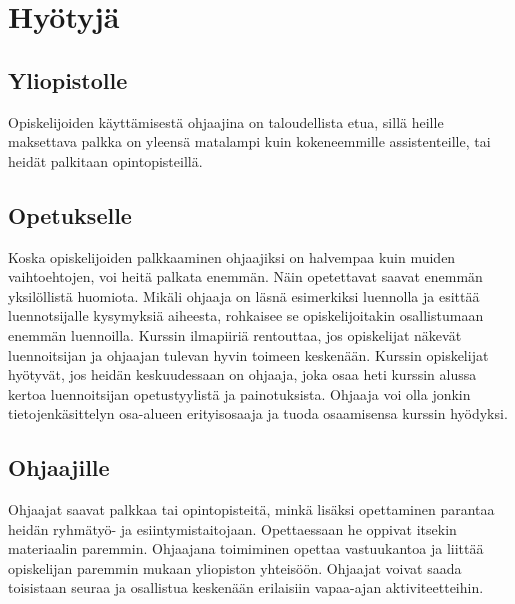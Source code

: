 \documentclass[finnish]{tktltiki2}
\theoremstyle{definition}
\theoremstyle{remark}
\begin{document}
\section{Hyötyjä}

\subsection{Yliopistolle}
Opiskelijoiden käyttämisestä ohjaajina on taloudellista etua, sillä heille maksettava palkka on yleensä matalampi kuin kokeneemmille assistenteille, tai heidät palkitaan opintopisteillä.

\subsection{Opetukselle}
Koska opiskelijoiden palkkaaminen ohjaajiksi on halvempaa kuin muiden vaihtoehtojen, voi heitä palkata enemmän. Näin opetettavat saavat enemmän yksilöllistä huomiota. Mikäli ohjaaja on läsnä esimerkiksi luennolla ja esittää luennotsijalle kysymyksiä aiheesta, rohkaisee se opiskelijoitakin osallistumaan enemmän luennoilla. Kurssin ilmapiiriä rentouttaa, jos opiskelijat näkevät luennoitsijan ja ohjaajan tulevan hyvin toimeen keskenään. Kurssin opiskelijat hyötyvät, jos heidän keskuudessaan on ohjaaja, joka osaa heti kurssin alussa kertoa luennoitsijan opetustyylistä ja painotuksista. Ohjaaja voi olla jonkin tietojenkäsittelyn osa-alueen erityisosaaja ja tuoda osaamisensa kurssin hyödyksi.\cite{Dickson11}

\subsection{Ohjaajille}
Ohjaajat saavat palkkaa tai opintopisteitä, minkä lisäksi opettaminen parantaa heidän ryhmätyö- ja esiintymistaitojaan. Opettaessaan he oppivat itsekin materiaalin paremmin.\cite{Reges03} Ohjaajana toimiminen opettaa vastuukantoa ja liittää opiskelijan paremmin mukaan yliopiston yhteisöön.\cite{Dickson11} Ohjaajat voivat saada toisistaan seuraa ja osallistua keskenään erilaisiin vapaa-ajan aktiviteetteihin.\cite{Roberts95}


\end{document}
